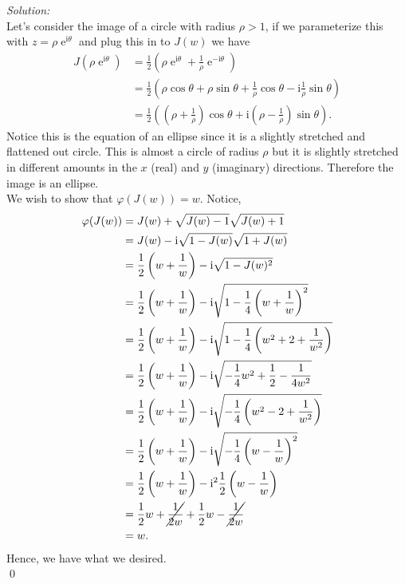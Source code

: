 \documentclass[10pt]{amsart}
\newcommand{\I}{\mathrm{i}}
\DeclareMathOperator{\E}{e}
\theoremstyle{nonumberplain}
\begin{document}
\begin{enumerate}[label={\bf {\arabic*}:}]
\begin{enumerate}
\noindent
\textit{Solution:} \\
Let's consider the image of a circle with radius $\rho > 1$, if we parameterize this with $z = \rho \E^{\I \theta}$ and plug this in to $J(w)$ we have
\begin{align*}
J(\rho\E^{\I \theta})
	&= \frac 1 2 \left( \rho\E^{\I \theta} + \frac 1 \rho \E^{-\I \theta} \right) \\
	&= \frac 1 2 \left( \rho \cos \theta + \rho \sin \theta + \frac 1 \rho \cos \theta - \I \frac 1 \rho \sin \theta \right) \\
	&= \frac 1 2 \left( \left( \rho + \frac 1 \rho\right) \cos \theta + \I \left( \rho  - \frac 1 \rho \right) \sin \theta \right).
\end{align*}
Notice this is the equation of an ellipse since it is a slightly stretched and flattened out circle.
This is almost a circle of radius $\rho$ but it is slightly stretched in different amounts in the $x$ (real) and $y$ (imaginary) directions.
Therefore the image is an ellipse. \\

\noindent
We wish to show that $\varphi(J(w)) = w $.
Notice, 
\begin{align*}
\varphi(J(w)) &= J(w) + \sqrt{J(w) - 1}\sqrt{J(w) + 1} \\
	&= J(w) - \I \sqrt{1 - J(w)}\sqrt{1 + J(w) } \\
	&= \frac 1 2 \left( w + \frac 1 w \right) - \I \sqrt{1 - J(w)^2} \\
	&= \frac 1 2 \left( w + \frac 1 w \right) - \I \sqrt{1 - \frac 1 4 \left( w + \frac 1 w \right)^2} \\
	&= \frac 1 2 \left( w + \frac 1 w \right) - \I \sqrt{1 - \frac 1 4 \left( w^2 + 2 + \frac 1 {w^2} \right)} \\
	&= \frac 1 2 \left( w + \frac 1 w \right) - \I \sqrt{- \frac 1 4 w^2 + \frac 1 2 - \frac 1 {4w^2} } \\
	&= \frac 1 2 \left( w + \frac 1 w \right) - \I \sqrt{- \frac 1 4 \left( w^2 - 2  + \frac 1 {w^2} \right) } \\
	&= \frac 1 2 \left( w + \frac 1 w \right) - \I \sqrt{- \frac 1 4 \left( w -  \frac 1 {w} \right)^2 } \\
	&= \frac 1 2 \left( w + \frac 1 w \right) - \I^2 \frac 1 2 \left( w -  \frac 1 {w} \right) \\
	&= \frac 1 2 w + \cancel{\frac 1 {2w}} + \frac 1 2 w - \cancel{\frac 1 {2w}} \\
	&= w.
\end{align*}
Hence, we have what we desired. \\
\qed \\


\end{enumerate}
\end{enumerate}
\end{document}
